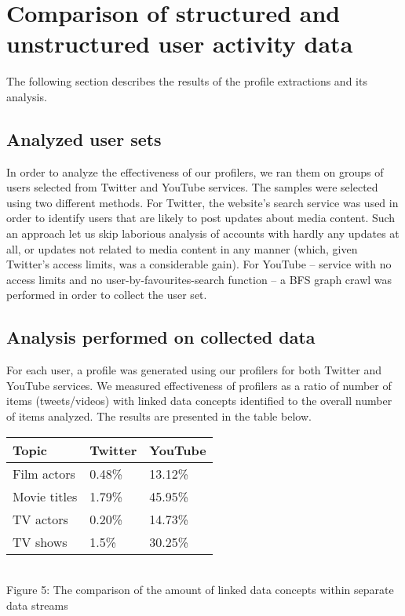 \section{Comparison of structured and unstructured user activity data}

The following section describes the results of the profile extractions and its
analysis.

\subsection{Analyzed user sets}
In order to analyze the effectiveness of our profilers, we ran them on groups of
users selected from Twitter and YouTube services. The samples were selected
using two different methods. For Twitter, the website's search service was used
in order to identify users that are likely to post updates about media content.
Such an approach let us skip laborious analysis of accounts with hardly any
updates at all, or updates not related to media content in any manner (which,
given Twitter's access limits, was a considerable gain). For YouTube -- service
with no access limits and no user-by-favourites-search function -- a BFS graph
crawl was performed in order to collect the user set.

\subsection{Analysis performed on collected data}

For each user, a profile was generated using our profilers for both Twitter and
YouTube services. We measured effectiveness of profilers as a ratio of number of
items (tweets/videos) with linked data concepts identified to the overall number
of items analyzed. The results are presented in the table below.

\begin{center}
  \begin{tabular}{| l | l | l |}
  Topic & Twitter & YouTube \\ \hline
  Film actors & 0.48\% & 13.12\% \\
  Movie titles & 1.79\% & 45.95\% \\
  TV actors & 0.20\% & 14.73\% \\
  TV shows & 1.5\% & 30.25\% \\
  \end{tabular} \\
  Figure 5: The comparison of the amount of linked data concepts within separate data streams \\
\end{center}

